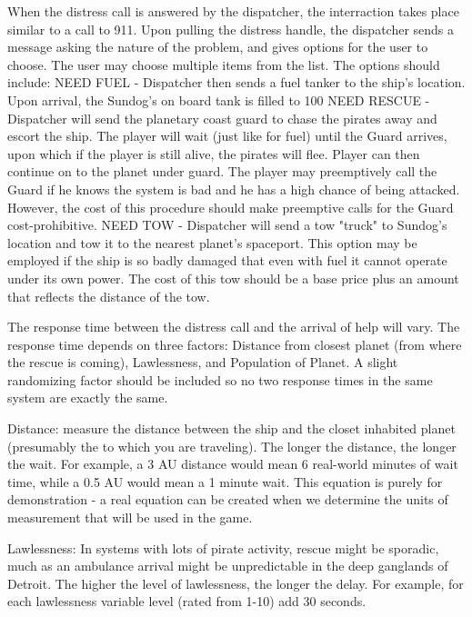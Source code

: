 When the distress call is answered by the dispatcher, the interraction takes place similar to a call to 911. Upon pulling the distress handle, the dispatcher sends a message asking the nature of the problem, and gives options for the user to choose. The user may choose multiple items from the list. The options should include: 
NEED FUEL - Dispatcher then sends a fuel tanker to the ship's location. Upon arrival, the Sundog's on board tank is filled to 100%
NEED RESCUE - Dispatcher will send the planetary coast guard to chase the pirates away and escort the ship. The player will wait (just like for fuel) until the Guard arrives, upon which if the player is still alive, the pirates will flee. Player can then continue on to the planet under guard. The player may preemptively call the Guard if he knows the system is bad and he has a high chance of being attacked. However, the cost of this procedure should make preemptive calls for the Guard cost-prohibitive.
NEED TOW - Dispatcher will send a tow "truck" to Sundog's location and tow it to the nearest planet's spaceport. This option may be employed if the ship is so badly damaged that even with fuel it cannot operate under its own power. The cost of this tow should be a base price plus an amount that reflects the distance of the tow. 

The response time between the distress call and the arrival of help will vary. The response time depends on three factors: Distance from closest planet (from where the rescue is coming), Lawlessness, and Population of Planet. A slight randomizing factor should be included so no two response times in the same system are exactly the same. 
 
Distance: measure the distance between the ship and the closet inhabited planet (presumably the to which you are traveling). The longer the distance, the longer the wait. For example, a 3 AU distance would mean 6 real-world minutes of wait time, while a 0.5 AU would mean a 1 minute wait. This equation is purely for demonstration - a real equation can be created when we determine the units of measurement that will be used in the game. 

Lawlessness: In systems with lots of pirate activity, rescue might be sporadic, much as an ambulance arrival might be unpredictable in the deep ganglands of Detroit. The higher the level of lawlessness, the longer the delay. For example, for each lawlessness variable level (rated from 1-10) add 30 seconds. 

